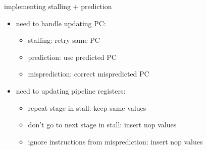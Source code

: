 \begin{frame}{implementing stalling + prediction}
    \begin{itemize}
    \item need to handle updating PC:
        \begin{itemize}
        \item stalling: retry same PC
        \item prediction: use predicted PC
        \item misprediction: correct mispredicted PC
        \end{itemize}
    \item need to updating pipeline registers:
        \begin{itemize}
        \item repeat stage in stall: keep same values
        \item don't go to next stage in stall: insert nop values
        \item ignore instructions from misprediction: insert nop values
        \end{itemize}
    \end{itemize}
\end{frame}
